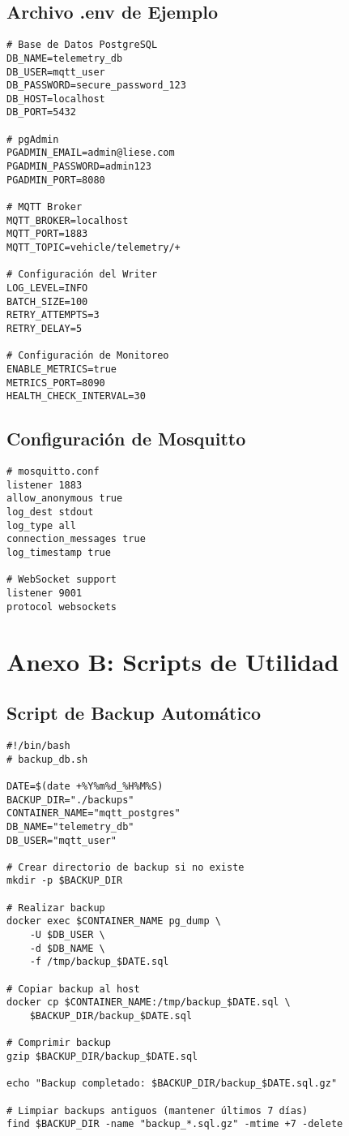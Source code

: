 \subsection{Archivo .env de Ejemplo}

\begin{verbatim}
# Base de Datos PostgreSQL
DB_NAME=telemetry_db
DB_USER=mqtt_user
DB_PASSWORD=secure_password_123
DB_HOST=localhost
DB_PORT=5432

# pgAdmin
PGADMIN_EMAIL=admin@liese.com
PGADMIN_PASSWORD=admin123
PGADMIN_PORT=8080

# MQTT Broker
MQTT_BROKER=localhost
MQTT_PORT=1883
MQTT_TOPIC=vehicle/telemetry/+

# Configuración del Writer
LOG_LEVEL=INFO
BATCH_SIZE=100
RETRY_ATTEMPTS=3
RETRY_DELAY=5

# Configuración de Monitoreo
ENABLE_METRICS=true
METRICS_PORT=8090
HEALTH_CHECK_INTERVAL=30
\end{verbatim}

\subsection{Configuración de Mosquitto}

\begin{verbatim}
# mosquitto.conf
listener 1883
allow_anonymous true
log_dest stdout
log_type all
connection_messages true
log_timestamp true

# WebSocket support
listener 9001
protocol websockets
\end{verbatim}

\section{Anexo B: Scripts de Utilidad}

\subsection{Script de Backup Automático}

\begin{verbatim}
#!/bin/bash
# backup_db.sh

DATE=$(date +%Y%m%d_%H%M%S)
BACKUP_DIR="./backups"
CONTAINER_NAME="mqtt_postgres"
DB_NAME="telemetry_db"
DB_USER="mqtt_user"

# Crear directorio de backup si no existe
mkdir -p $BACKUP_DIR

# Realizar backup
docker exec $CONTAINER_NAME pg_dump \
    -U $DB_USER \
    -d $DB_NAME \
    -f /tmp/backup_$DATE.sql

# Copiar backup al host
docker cp $CONTAINER_NAME:/tmp/backup_$DATE.sql \
    $BACKUP_DIR/backup_$DATE.sql

# Comprimir backup
gzip $BACKUP_DIR/backup_$DATE.sql

echo "Backup completado: $BACKUP_DIR/backup_$DATE.sql.gz"

# Limpiar backups antiguos (mantener últimos 7 días)
find $BACKUP_DIR -name "backup_*.sql.gz" -mtime +7 -delete
\end{verbatim}

